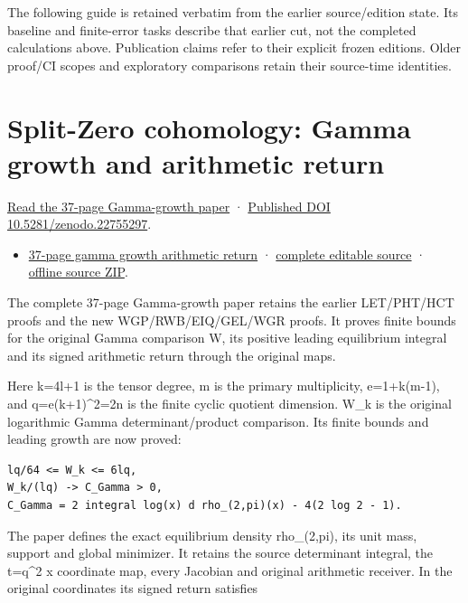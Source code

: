 \documentclass[
]{article}
\providecommand{\tightlist}{%
  \setlength{\itemsep}{0pt}\setlength{\parskip}{0pt}}
\begin{document}
The following guide is retained verbatim from the earlier source/edition
state. Its baseline and finite-error tasks describe that earlier cut,
not the completed calculations above. Publication claims refer to their
explicit frozen editions. Older proof/CI scopes and exploratory
comparisons retain their source-time identities.

\section{Split-Zero cohomology: Gamma growth and arithmetic
return}\label{split-zero-cohomology-gamma-growth-and-arithmetic-return}

\href{https://zenodo.org/api/records/22755297/files/49-gamma-growth-arithmetic-return-reader.pdf/content}{Read
the 37-page Gamma-growth paper} ·
\href{https://doi.org/10.5281/zenodo.22755297}{Published DOI
10.5281/zenodo.22755297}.

\begin{itemize}
\tightlist
\item
  \href{https://zenodo.org/api/records/22755297/files/49-gamma-growth-arithmetic-return-reader.pdf/content}{37-page
  gamma growth arithmetic return} ·
  \href{https://github.com/KokunoYumeto/zeta-function-research-reader/tree/41f020e0475429943252e69a1b4edd849393c780/workbenches/splitzero-tandem/continuations/20260914-gamma-growth}{complete
  editable source} ·
  \href{https://zenodo.org/api/records/22755297/files/50-gamma-growth-public-sources.zip/content}{offline
  source ZIP}.
\end{itemize}

The complete 37-page Gamma-growth paper retains the earlier LET/PHT/HCT
proofs and the new WGP/RWB/EIQ/GEL/WGR proofs. It proves finite bounds
for the original Gamma comparison W, its positive leading equilibrium
integral and its signed arithmetic return through the original maps.

Here k=4l+1 is the tensor degree, m is the primary multiplicity,
e=1+k(m-1), and q=e(k+1)\^{}2=2n is the finite cyclic quotient
dimension. W\_k is the original logarithmic Gamma determinant/product
comparison. Its finite bounds and leading growth are now proved:

\begin{verbatim}
lq/64 <= W_k <= 6lq,
W_k/(lq) -> C_Gamma > 0,
C_Gamma = 2 integral log(x) d rho_(2,pi)(x) - 4(2 log 2 - 1).
\end{verbatim}

The paper defines the exact equilibrium density rho\_(2,pi), its unit
mass, support and global minimizer. It retains the source determinant
integral, the t=q\^{}2 x coordinate map, every Jacobian and original
arithmetic receiver. In the original coordinates its signed return
satisfies
\end{document}
